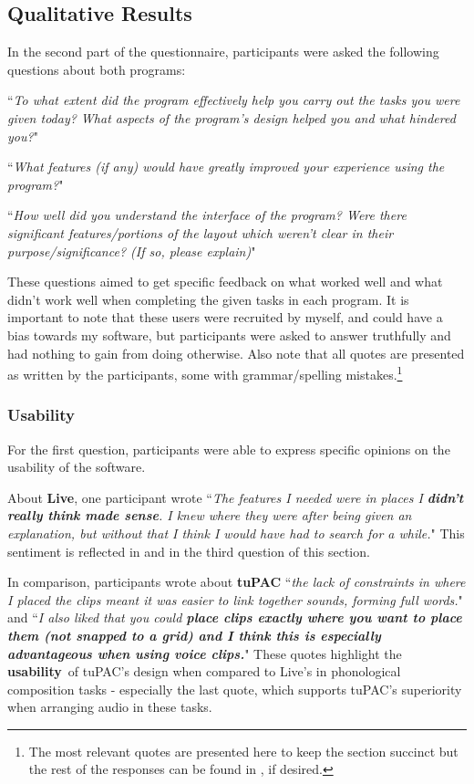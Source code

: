 \documentclass[12pt,a4paper,oneside,openright]{report}
\newcommand{\usability}{\textbf{usability}}
\newcommand{\quoteT}[1]{``\textit{#1}"}
\begin{document}
\subsection{Qualitative Results}\label{sec:qual_res}
In the second part of the questionnaire, participants were asked the following questions about both programs:

\quoteT{To what extent did the program effectively help you carry out the tasks you were given today? What aspects of the program's design helped you and what hindered you?}

\quoteT{What features (if any) would have greatly improved your experience using the program?}

\quoteT{How well did you understand the interface of the program? Were there significant features/portions of the layout which weren't clear in their purpose/significance? (If so, please explain)}

These questions aimed to get specific feedback on what worked well and what didn't work well when completing the given tasks in each program. It is important to note that these users were recruited by myself, and could have a bias towards my software, but participants were asked to answer truthfully and had nothing to gain from doing otherwise. Also note that all quotes are presented as written by the participants, some with grammar/spelling mistakes.\footnote{The most relevant quotes are presented here to keep the section succinct but the rest of the responses can be found in , if desired.}

\subsubsection{Usability}
For the first question, participants were able to express specific opinions on the usability of the software. 

About \textbf{Live}, one participant wrote \quoteT{The features I needed were in places I \textbf{didn’t really think made sense}. I knew where they were after being given an explanation, but without that I think I would have had to search for a while.} This sentiment is reflected in  and in the third question of this section. 

In comparison, participants wrote about \textbf{tuPAC} \quoteT{the lack of constraints in where I placed the clips meant it was easier to link together sounds, forming full words.} and \quoteT{I also liked that you could \textbf{place clips exactly where you want to place them (not snapped to a grid) and I think this is especially advantageous when using voice clips.}} These quotes highlight the \usability\ of tuPAC's design when compared to Live's in phonological composition tasks - especially the last quote, which supports tuPAC's superiority when arranging audio in these tasks.
\end{document}
